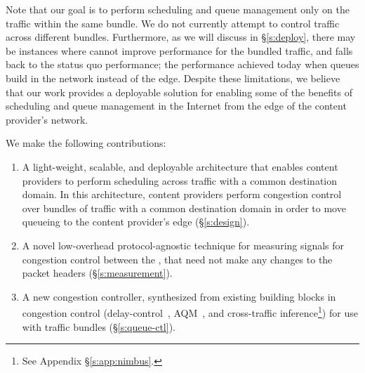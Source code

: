 Note that our goal is to perform scheduling and queue management only on the traffic within the same bundle. We do not currently attempt to control traffic across different bundles. 
Furthermore, as we will discuss in \S\ref{s:deploy}, there may be instances where \name cannot improve performance for the bundled traffic, and falls back to the status quo performance; \ie the performance achieved today when queues build in the network instead of the edge. 
Despite these limitations, we believe that our work provides a deployable solution for enabling some of the benefits of scheduling and queue management in the Internet from the edge of the content provider's network.
 
We make the following contributions:
\begin{enumerate}
    \item A light-weight, scalable, and deployable architecture that enables content providers to perform scheduling across traffic with a common destination domain. In this architecture, content providers perform congestion control over bundles of traffic with a common destination domain in order to move queueing to the content provider's edge (\S\ref{s:design}).
     \item A novel low-overhead protocol-agnostic technique for measuring signals for congestion control between the \pair, that need not make any changes to the packet headers (\S\ref{s:measurement}).
     \item A new congestion controller, synthesized from existing building blocks in congestion control (delay-control~\cite{copa}, AQM~\cite{pie}, and cross-traffic inference\footnote{See Appendix \S\ref{s:app:nimbus}.}) for use with traffic bundles (\S\ref{s:queue-ctl}).
\end{enumerate}
